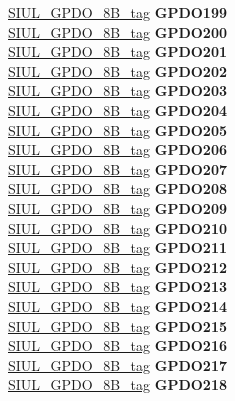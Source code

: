 \begin{DoxyCompactItemize}
\begin{tabbing}
\>\>\mbox{\hyperlink{unionSIUL__GPDO__8B__tag}{SIUL\_GPDO\_8B\_tag}} {\bfseries GPDO199}\\
\>\>\mbox{\hyperlink{unionSIUL__GPDO__8B__tag}{SIUL\_GPDO\_8B\_tag}} {\bfseries GPDO200}\\
\>\>\mbox{\hyperlink{unionSIUL__GPDO__8B__tag}{SIUL\_GPDO\_8B\_tag}} {\bfseries GPDO201}\\
\>\>\mbox{\hyperlink{unionSIUL__GPDO__8B__tag}{SIUL\_GPDO\_8B\_tag}} {\bfseries GPDO202}\\
\>\>\mbox{\hyperlink{unionSIUL__GPDO__8B__tag}{SIUL\_GPDO\_8B\_tag}} {\bfseries GPDO203}\\
\>\>\mbox{\hyperlink{unionSIUL__GPDO__8B__tag}{SIUL\_GPDO\_8B\_tag}} {\bfseries GPDO204}\\
\>\>\mbox{\hyperlink{unionSIUL__GPDO__8B__tag}{SIUL\_GPDO\_8B\_tag}} {\bfseries GPDO205}\\
\>\>\mbox{\hyperlink{unionSIUL__GPDO__8B__tag}{SIUL\_GPDO\_8B\_tag}} {\bfseries GPDO206}\\
\>\>\mbox{\hyperlink{unionSIUL__GPDO__8B__tag}{SIUL\_GPDO\_8B\_tag}} {\bfseries GPDO207}\\
\>\>\mbox{\hyperlink{unionSIUL__GPDO__8B__tag}{SIUL\_GPDO\_8B\_tag}} {\bfseries GPDO208}\\
\>\>\mbox{\hyperlink{unionSIUL__GPDO__8B__tag}{SIUL\_GPDO\_8B\_tag}} {\bfseries GPDO209}\\
\>\>\mbox{\hyperlink{unionSIUL__GPDO__8B__tag}{SIUL\_GPDO\_8B\_tag}} {\bfseries GPDO210}\\
\>\>\mbox{\hyperlink{unionSIUL__GPDO__8B__tag}{SIUL\_GPDO\_8B\_tag}} {\bfseries GPDO211}\\
\>\>\mbox{\hyperlink{unionSIUL__GPDO__8B__tag}{SIUL\_GPDO\_8B\_tag}} {\bfseries GPDO212}\\
\>\>\mbox{\hyperlink{unionSIUL__GPDO__8B__tag}{SIUL\_GPDO\_8B\_tag}} {\bfseries GPDO213}\\
\>\>\mbox{\hyperlink{unionSIUL__GPDO__8B__tag}{SIUL\_GPDO\_8B\_tag}} {\bfseries GPDO214}\\
\>\>\mbox{\hyperlink{unionSIUL__GPDO__8B__tag}{SIUL\_GPDO\_8B\_tag}} {\bfseries GPDO215}\\
\>\>\mbox{\hyperlink{unionSIUL__GPDO__8B__tag}{SIUL\_GPDO\_8B\_tag}} {\bfseries GPDO216}\\
\>\>\mbox{\hyperlink{unionSIUL__GPDO__8B__tag}{SIUL\_GPDO\_8B\_tag}} {\bfseries GPDO217}\\
\>\>\mbox{\hyperlink{unionSIUL__GPDO__8B__tag}{SIUL\_GPDO\_8B\_tag}} {\bfseries GPDO218}\\

\end{tabbing}
\end{DoxyCompactItemize}
